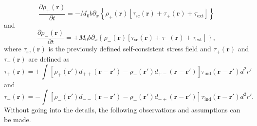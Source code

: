 \begin{equation}
\frac{{\partial {\rho _ + }\left( {\mathbf{r}} \right)}}{{\partial t}} =  - {M_0}b{\partial _x}\left\{ {{\rho _ + }\left( {\mathbf{r}} \right)\left[ {{\tau _{{\text{sc}}}}\left( {\mathbf{r}} \right) + {\tau _ + }\left( {\mathbf{r}} \right) + {\tau _{{\text{ext}}}}} \right]} \right\}
\end{equation}
and
\begin{equation}
\frac{{\partial {\rho _ - }\left( {\mathbf{r}} \right)}}{{\partial t}} =  + {M_0}b{\partial _x}\left\{ {{\rho _ - }\left( {\mathbf{r}} \right)\left[ {{\tau _{{\text{sc}}}}\left( {\mathbf{r}} \right) + {\tau _ - }\left( {\mathbf{r}} \right) + {\tau _{{\text{ext}}}}} \right]} \right\},
\end{equation}
where ${{\tau _{{\text{sc}}}}\left( {\mathbf{r}} \right)}$ is the previously defined self-consistent stress field and ${{\tau _ + }\left( {\mathbf{r}} \right)}$ and ${{\tau _ - }\left( {\mathbf{r}} \right)}$ are defined as
\begin{equation}
{\tau _ + }\left( {\mathbf{r}} \right) = + \int {\left[ {{\rho _ + }\left( {{\mathbf{r}}'} \right){d_{ +  + }}\left( {{\mathbf{r}} - {\mathbf{r}}'} \right) - {\rho _ - }\left( {{\mathbf{r}}'} \right){d_{ +  - }}\left( {{\mathbf{r}} - {\mathbf{r}}'} \right)} \right]{\tau _{{\text{ind}}}}\left( {{\mathbf{r}} - {\mathbf{r}}'} \right){d^2}r'}
\end{equation}
and
\begin{equation}
{\tau _ - }\left( {\mathbf{r}} \right) =  - \int {\left[ {{\rho _ - }\left( {{\mathbf{r}}'} \right){d_{ -  - }}\left( {{\mathbf{r}} - {\mathbf{r}}'} \right) - {\rho _ - }\left( {{\mathbf{r}}'} \right){d_{ -  + }}\left( {{\mathbf{r}} - {\mathbf{r}}'} \right)} \right]{\tau _{{\text{ind}}}}\left( {{\mathbf{r}} - {\mathbf{r}}'} \right){d^2}r'}.
\end{equation}
Without going into the details, the following observations and assumptions can be made.
